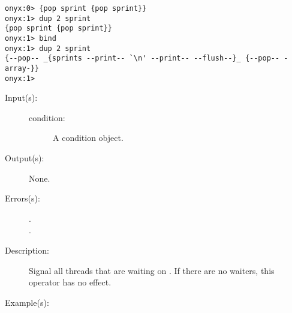 \begin{description}
\begin{description}
\begin{verbatim}
onyx:0> {pop sprint {pop sprint}}
onyx:1> dup 2 sprint
{pop sprint {pop sprint}}
onyx:1> bind
onyx:1> dup 2 sprint
{--pop-- _{sprints --print-- `\n' --print-- --flush--}_ {--pop-- -array-}}
onyx:1>
		\end{verbatim}
	\end{description}
\label{systemdict:broadcast}
\item[{\onyxop{condition}{broadcast}{--}}: ]
	\begin{description}\item[]
	\item[Input(s): ]
		\begin{description}\item[]
		\item[condition: ]
			A condition object.
		\end{description}
	\item[Output(s): ] None.
	\item[Errors(s): ]
		\begin{description}\item[]
		\item[.]
		\item[.]
		\end{description}
	\item[Description: ]
		Signal all threads that are waiting on .  If
		there are no waiters, this operator has no effect.
	\item[Example(s): ]\begin{verbatim}


\end{verbatim}
\end{description}
\end{description}
